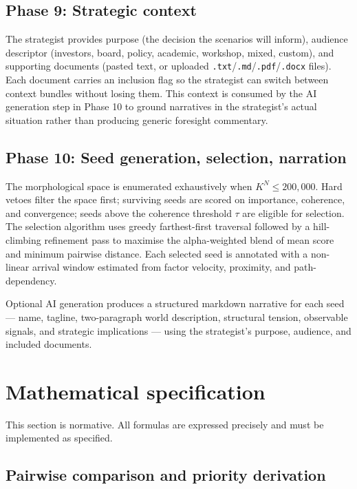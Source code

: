 \documentclass[11pt,a4paper]{article}
\begin{document}
\subsection{Phase 9: Strategic context}

The strategist provides purpose (the decision the scenarios will inform), audience descriptor (investors, board, policy, academic, workshop, mixed, custom), and supporting documents (pasted text, or uploaded \texttt{.txt}/\texttt{.md}/\texttt{.pdf}/\texttt{.docx} files). Each document carries an inclusion flag so the strategist can switch between context bundles without losing them. This context is consumed by the AI generation step in Phase 10 to ground narratives in the strategist's actual situation rather than producing generic foresight commentary.

\subsection{Phase 10: Seed generation, selection, narration}

The morphological space is enumerated exhaustively when $K^N \le 200{,}000$. Hard vetoes filter the space first; surviving seeds are scored on importance, coherence, and convergence; seeds above the coherence threshold $\tau$ are eligible for selection. The selection algorithm uses greedy farthest-first traversal followed by a hill-climbing refinement pass to maximise the alpha-weighted blend of mean score and minimum pairwise distance. Each selected seed is annotated with a non-linear arrival window estimated from factor velocity, proximity, and path-dependency.

Optional AI generation produces a structured markdown narrative for each seed — name, tagline, two-paragraph world description, structural tension, observable signals, and strategic implications — using the strategist's purpose, audience, and included documents.

\section{Mathematical specification}

This section is normative. All formulas are expressed precisely and must be implemented as specified.

\subsection{Pairwise comparison and priority derivation}
\end{document}
